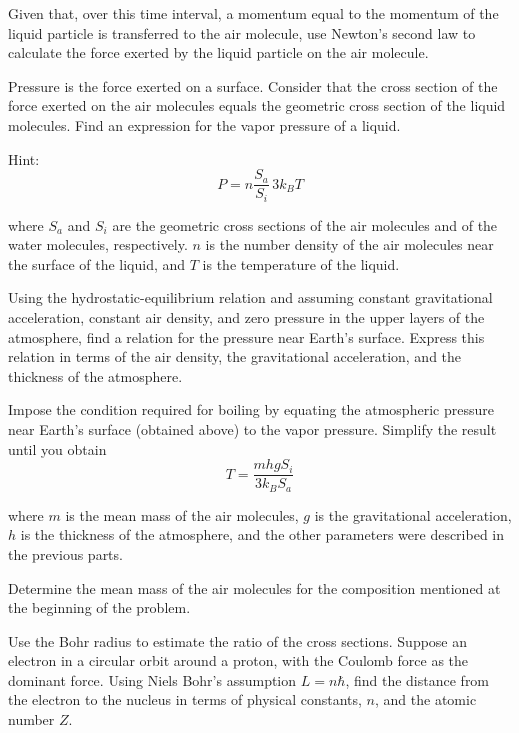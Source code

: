 \documentclass[11pt]{article}
\begin{document}
\begin{pproblem}
\begin{alternativas}
Given that, over this time interval, a momentum equal to the momentum of the liquid particle is transferred to the air molecule, use Newton's second law to calculate the force exerted by the liquid particle on the air molecule.

\item Pressure is the force exerted on a surface. Consider that the cross section of the force exerted on the air molecules equals the geometric cross section of the liquid molecules. Find an expression for the vapor pressure of a liquid.

Hint:
\begin{equation}
    P = n \frac{S_a}{S_i} \, 3k_BT
\end{equation}

where $S_a$ and $S_i$ are the geometric cross sections of the air molecules and of the water molecules, respectively. $n$ is the number density of the air molecules near the surface of the liquid, and $T$ is the temperature of the liquid.

\item Using the hydrostatic-equilibrium relation and assuming constant gravitational acceleration, constant air density, and zero pressure in the upper layers of the atmosphere, find a relation for the pressure near Earth's surface. Express this relation in terms of the air density, the gravitational acceleration, and the thickness of the atmosphere.

\item Impose the condition required for boiling by equating the atmospheric pressure near Earth's surface (obtained above) to the vapor pressure. Simplify the result until you obtain
\begin{equation}
    T = \frac{mhg S_i}{3k_B S_a}
\end{equation}

where $m$ is the mean mass of the air molecules, $g$ is the gravitational acceleration, $h$ is the thickness of the atmosphere, and the other parameters were described in the previous parts.

\item Determine the mean mass of the air molecules for the composition mentioned at the beginning of the problem.

\item Use the Bohr radius to estimate the ratio of the cross sections. Suppose an electron in a circular orbit around a proton, with the Coulomb force as the dominant force. Using Niels Bohr's assumption $L = n\hbar$, find the distance from the electron to the nucleus in terms of physical constants, $n$, and the atomic number $Z$.


\end{alternativas}
\end{pproblem}
\end{document}
